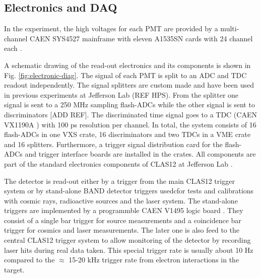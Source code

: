 \documentclass[3p,final,twocolumn]{elsarticle}
\begin{document}
\subsection{Electronics and DAQ}
In the experiment, the high voltages for each PMT are provided by a multi-channel CAEN SYS4527 mainframe with eleven A1535SN cards with 24 channel each \cite{caen-hvframe,caen-hvcard}.

A schematic drawing of the read-out electronics and its components is shown in Fig. \ref{fig:electronic-diag}. The signal of each PMT is split to an ADC and TDC readout independently. 
The signal splitters are custom made and have been used in previous experiments at Jefferson Lab (REF HPS).
From the splitter one signal is sent to a 250 \si{\mega\hertz} sampling flash-ADCs \cite{fadc-manual} while the other signal is sent to  discriminators [ADD REF].
The discriminated time signal goes to a TDC (CAEN VX1190A \cite{caen-tdc}) with 100 ps resolution per channel. 
In total, the system consists of 16 flash-ADCs in one VXS crate, 16 discriminators and two TDCs in a VME crate and 16 splitters.  Furthermore, a trigger signal distribution card for the flash-ADCs and trigger interface boards are installed in the crates. All components are part of the standard electronics components of CLAS12 at Jefferson Lab \cite{clas12-daq, clas12-trigger}.

The detector is read-out either by a trigger from the main CLAS12 trigger system \cite{clas12-trigger} or by stand-alone BAND detector triggers usedcfor tests and calibrations with cosmic rays, radioactive sources and the laser system. The stand-alone triggers are implemented by a programmble CAEN V1495 logic board \cite{caen-logicboard}. They consist of a single bar trigger for source measurements and a coincidence bar trigger for cosmics and laser measurements. The later one is also feed to the central CLAS12 trigger system to allow monitoring of the detector by recording laser hits during real data taken. This special trigger rate is usually about 10 \si{\hertz} compared to the $\approx$ 15-20 \si{\kilo\hertz} trigger rate from electron interactions in the target.
\end{document}
